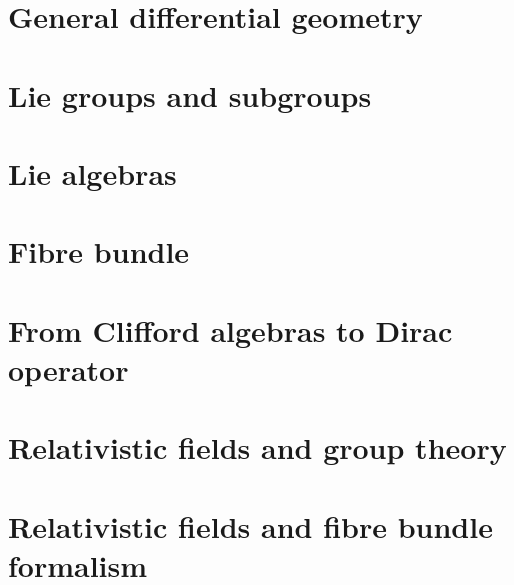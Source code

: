     \tableofcontents

    \newpage


\pagestyle{headings}



\chapter{General differential geometry} \label{Chapitre_FB}


\chapter{Lie groups and subgroups}


\chapter{Lie algebras}


\chapter{Fibre bundle}


%

\chapter{From Clifford algebras to Dirac operator}



\chapter{Relativistic fields and group theory}


\chapter{Relativistic fields and fibre bundle formalism}





\appendix
\setcounter{chapter}{0}
\setcounter{section}{0}
\renewcommand{\theequation}{\Alph{chapter}.\arabic{equation}}
\renewcommand{\thenumtho}{\Alph{chapter}.\arabic{numtho}}
\renewcommand{\thechapter}{\Alph{chapter}}




